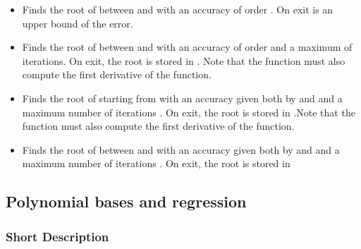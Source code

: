 \begin{itemize}

  \item {}
    \sshortdescribe Finds the root of  between  and  with
    an accuracy of order . On exit  is an upper bound of the
    error.

  \item {}
    \sshortdescribe Finds the root of  between  and  with
    an accuracy of order  and a maximum of  iterations. On
    exit, the root is stored in . Note that the function  must
    also compute the first derivative of the function.


  \item {}
    \sshortdescribe Finds the root of  starting from  with an
    accuracy given both by  and  and a maximum number of
    iterations . On exit, the root is stored in .Note that
    the function  must also compute the first derivative of the function.

  \item {}
    \sshortdescribe Finds the root of  between  and  with
    an accuracy given both by  and  and a maximum number
    of iterations . On exit, the root is stored in 
\end{itemize}


\subsection{Polynomial bases and regression}
\subsubsection{Short Description}


